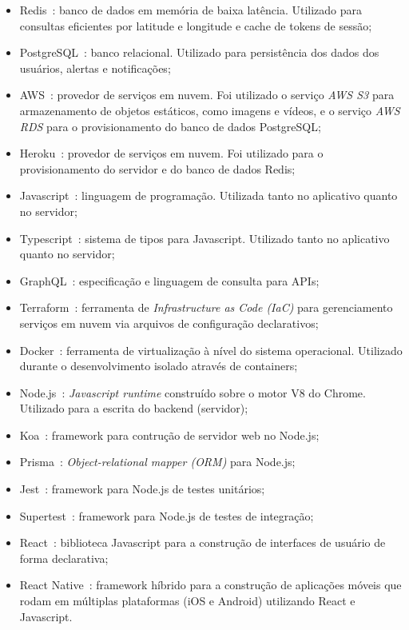 \begin{itemize}
	\item Redis~\cite{redis}: banco de dados em memória de baixa latência. Utilizado para consultas eficientes por latitude e longitude e cache de tokens de sessão;
	\item PostgreSQL~\cite{postgresql}: banco relacional. Utilizado para persistência dos dados dos usuários, alertas e notificações;
	\item AWS~\cite{aws}: provedor de serviços em nuvem. Foi utilizado o serviço \emph{AWS S3} para armazenamento de objetos estáticos, como imagens e vídeos, e o serviço \emph{AWS RDS} para o provisionamento do banco de dados PostgreSQL;
	\item Heroku~\cite{heroku}: provedor de serviços em nuvem. Foi utilizado para o provisionamento do servidor e do banco de dados Redis;
	\item Javascript~\cite{javascript}: linguagem de programação. Utilizada tanto no aplicativo quanto no servidor;
	\item Typescript~\cite{typescript}: sistema de tipos para Javascript. Utilizado tanto  no aplicativo quanto no servidor;
	\item GraphQL~\cite{graphql}: especificação e linguagem de consulta para APIs;
	\item Terraform~\cite{terraform}: ferramenta de \emph{Infrastructure as Code (IaC)} para gerenciamento serviços em nuvem via arquivos de configuração declarativos;
	\item Docker~\cite{docker}: ferramenta de virtualização à nível do sistema operacional. Utilizado durante o desenvolvimento isolado através de containers;
	\item Node.js~\cite{node}: \emph{Javascript runtime} construído sobre o motor V8 do Chrome. Utilizado para a escrita do backend (servidor);
	\item Koa~\cite{koa}: framework para contrução de servidor web no Node.js;
	\item Prisma~\cite{prisma}: \emph{Object-relational mapper (ORM)} para Node.js;
	\item Jest~\cite{jest}: framework para Node.js de testes unitários;
	\item Supertest~\cite{supertest}: framework para Node.js de testes de integração;
	\item React~\cite{react}: biblioteca Javascript para a construção de interfaces de usuário de forma declarativa;
	\item React Native~\cite{react-native}: framework híbrido para a construção de aplicações móveis que rodam em múltiplas plataformas (iOS e Android) utilizando React e Javascript. 	

\end{itemize}
